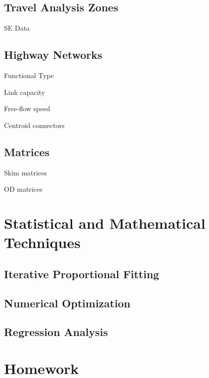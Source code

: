 \documentclass[]{book}
\begin{document}
\hypertarget{travel-analysis-zones}{%
\subsection{Travel Analysis Zones}\label{travel-analysis-zones}}

SE Data

\hypertarget{highway-networks}{%
\subsection{Highway Networks}\label{highway-networks}}

Functional Type

Link capacity

Free-flow speed

Centroid connectors

\hypertarget{matrices}{%
\subsection{Matrices}\label{matrices}}

Skim matrices

OD matrices

\hypertarget{statistical-and-mathematical-techniques}{%
\section{Statistical and Mathematical Techniques}\label{statistical-and-mathematical-techniques}}

\hypertarget{iterative-proportional-fitting}{%
\subsection{Iterative Proportional Fitting}\label{iterative-proportional-fitting}}

\hypertarget{numerical-optimization}{%
\subsection{Numerical Optimization}\label{numerical-optimization}}

\hypertarget{regression-analysis}{%
\subsection{Regression Analysis}\label{regression-analysis}}

\hypertarget{hw-blocks}{%
\section*{Homework}\label{hw-blocks}}
\end{document}
